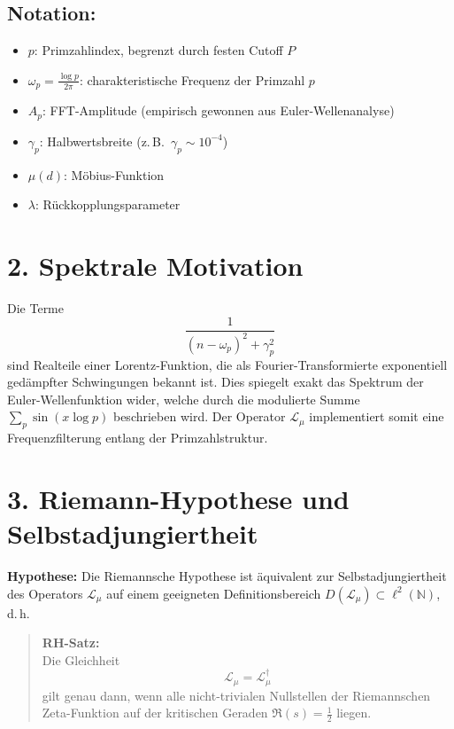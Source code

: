 \documentclass[12pt]{article}
\begin{document}
\subsection*{Notation:}
\begin{itemize}
  \item \(p\): Primzahlindex, begrenzt durch festen Cutoff \(P\)
  \item \(\omega_p = \frac{\log p}{2\pi}\): charakteristische Frequenz der Primzahl \(p\)
  \item \(A_p\): FFT-Amplitude (empirisch gewonnen aus Euler-Wellenanalyse)
  \item \(\gamma_p\): Halbwertsbreite (z.\,B.\ \(\gamma_p \sim 10^{-4}\))
  \item \(\mu(d)\): Möbius-Funktion
  \item \(\lambda\): Rückkopplungsparameter
\end{itemize}

\bigskip

\section*{2. Spektrale Motivation}

Die Terme 
\[
\frac{1}{(n - \omega_p)^2 + \gamma_p^2}
\]
sind Realteile einer Lorentz-Funktion, die als Fourier-Transformierte exponentiell gedämpfter Schwingungen bekannt ist. Dies spiegelt exakt das Spektrum der Euler-Wellenfunktion wider, welche durch die modulierte Summe \(\sum_{p} \sin(x \log p)\) beschrieben wird. Der Operator \(\mathcal{L}_\mu\) implementiert somit eine Frequenzfilterung entlang der Primzahlstruktur.

\bigskip

\section*{3. Riemann-Hypothese und Selbstadjungiertheit}

\textbf{Hypothese:} Die Riemannsche Hypothese ist äquivalent zur Selbstadjungiertheit des Operators \(\mathcal{L}_\mu\) auf einem geeigneten Definitionsbereich \(D(\mathcal{L}_\mu) \subset \ell^2(\mathbb{N})\), d.\,h.

\begin{quote}
\textbf{RH-Satz:} \\
Die Gleichheit
\[
\mathcal{L}_\mu = \mathcal{L}_\mu^\dagger
\]
gilt genau dann, wenn alle nicht-trivialen Nullstellen der Riemannschen Zeta-Funktion auf der kritischen Geraden \(\Re(s) = \frac{1}{2}\) liegen.
\end{quote}
\end{document}
